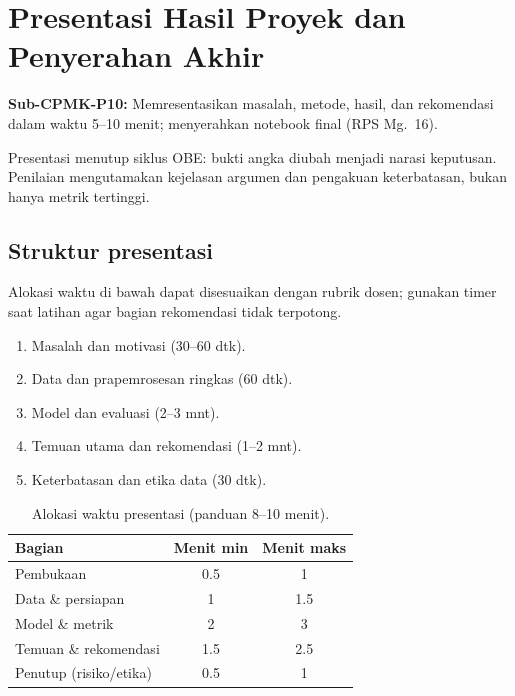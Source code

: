 \documentclass[../main.tex]{subfiles}
\begin{document}
\chapter{Presentasi Hasil Proyek dan Penyerahan Akhir}

\begin{subcpmk}
  \item \textbf{Sub-CPMK-P10:} Memresentasikan masalah, metode, hasil, dan rekomendasi dalam waktu 5--10 menit; menyerahkan notebook final (RPS Mg.\ 16).
\end{subcpmk}


\noindent Presentasi menutup siklus OBE: bukti angka diubah menjadi narasi keputusan. Penilaian mengutamakan kejelasan argumen dan pengakuan keterbatasan, bukan hanya metrik tertinggi.

\section{Struktur presentasi}

Alokasi waktu di bawah dapat disesuaikan dengan rubrik dosen; gunakan timer saat latihan agar bagian rekomendasi tidak terpotong.

\begin{enumerate}[leftmargin=*]
  \item Masalah dan motivasi (30--60 dtk).
  \item Data dan prapemrosesan ringkas (60 dtk).
  \item Model dan evaluasi (2--3 mnt).
  \item Temuan utama dan rekomendasi (1--2 mnt).
  \item Keterbatasan dan etika data (30 dtk).
\end{enumerate}

\begin{table}[htbp]
\centering
\caption{Alokasi waktu presentasi (panduan 8--10 menit).}
\label{tab:waktu-presentasi}
\begin{tabular}{@{}p{4.5cm}cc@{}}
\toprule
\textbf{Bagian} & \textbf{Menit min} & \textbf{Menit maks} \\
\midrule
Pembukaan & 0.5 & 1 \\
Data \& persiapan & 1 & 1.5 \\
Model \& metrik & 2 & 3 \\
Temuan \& rekomendasi & 1.5 & 2.5 \\
Penutup (risiko/etika) & 0.5 & 1 \\
\bottomrule
\end{tabular}
\end{table}
\end{document}
